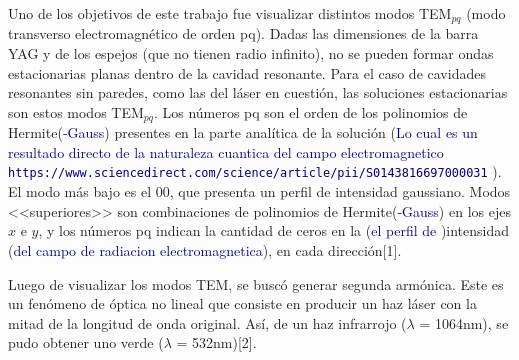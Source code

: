 \documentclass[10pt, a4paper]{article}%
\begin{document}
\begin{multicols}{2}
Uno de los objetivos de este trabajo fue visualizar distintos modos TEM$_{pq}$ (modo transverso electromagnético de orden pq). Dadas las dimensiones de la barra YAG y de los espejos (que no tienen radio infinito), no se pueden formar ondas estacionarias planas dentro de la cavidad resonante. Para el caso de cavidades resonantes sin paredes, como las del láser en cuestión, las soluciones estacionarias son estos modos TEM$_{pq}$. Los números pq son el orden de los polinomios de Hermite(\textcolor{DarkBlue}{-Gauss}) presentes en la parte analítica de la solución (\textcolor{DarkBlue}{Lo cual es un resultado directo de la naturaleza cuantica del campo electromagnetico \texttt{https://www.sciencedirect.com/science/article/pii/S0143816697000031} }). El modo más bajo es el 00, que presenta un perfil de intensidad gaussiano. Modos <<superiores>> son combinaciones de polinomios de Hermite(\textcolor{DarkBlue}{-Gauss}) en los ejes $x$ e $y$, y los números pq indican la cantidad de ceros en la (\textcolor{DarkBlue}{el perfil de })intensidad (\textcolor{DarkBlue}{del campo de radiacion electromagnetica}), en cada dirección[1].

Luego de visualizar los modos TEM, se buscó generar segunda armónica. Este es un fenómeno de óptica no lineal que consiste en producir un haz láser con la mitad de la longitud de onda original. Así, de un haz infrarrojo ($\lambda$ = 1064nm), se pudo obtener uno verde ($\lambda$ = 532nm)[2].







\end{multicols}
\end{document}
